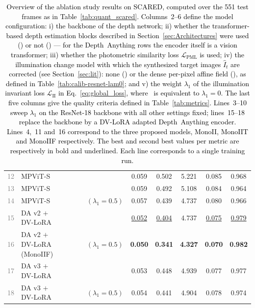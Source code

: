\documentclass[a4paper,fleqn]{cas-dc}
\newcommand{\cmark}{\ding{51}}
\newcommand{\xmark}{\ding{55}}
\begin{document}
\begin{table}[!t]
{\begin{tabular}{|r|l|c|c|c|c|c|c|c|c|c|}
        \textcolor{gray}{12} & MPViT-S & \cmark & \cmark & \cmark & \xmark & 0.059 & 0.502 & 5.221 & 0.085 & 0.968 \\
        \textcolor{gray}{13} & MPViT-S & \cmark & \cmark & \xmark & \xmark & 0.059 & 0.492 & 5.108 & 0.084 & 0.964 \\
        \textcolor{gray}{14} & MPViT-S & \cmark & \cmark & \xmark & \cmark $(\lambda_1 = 0.5)$ & 0.057 & 0.439 & 4.737 & 0.080 & 0.966 \\
        \hline
        \textcolor{gray}{15} & DA v2 $+$ DV-LoRA & \cmark & \cmark & \xmark & \xmark & \underline{0.052} & \underline{0.404} & 4.737 & \underline{0.075} & \underline{0.979} \\
        \textcolor{gray}{16} & DA v2 $+$ DV-LoRA (MonoIIF) & \cmark & \cmark & \cmark & \cmark $(\lambda_1 = 0.5)$ & \textbf{0.050} & \textbf{0.341} & \textbf{4.327} & \textbf{0.070} & \textbf{0.982}  \\
        \textcolor{gray}{17} & DA v3 $+$ DV-LoRA & \cmark & \cmark & \xmark & \xmark & 0.053 & 0.448 & 4.939 & 0.077 & 0.977  \\
        \textcolor{gray}{18} & DA v3 $+$ DV-LoRA & \cmark & \cmark & \cmark & \cmark $(\lambda_1 = 0.5)$ & 0.054 & 0.441 & 4.904 & 0.078 & 0.974 \\
        \hline
    \end{tabular}
    }
    \caption{\textcolor{black}{Overview of the ablation study results on SCARED, computed over the 551 test frames as in Table~\ref{tab:quant_scared}.
    Columns~2--6 define the model configuration: i) the backbone of the depth network; ii) whether the transformer-based depth estimation blocks described in Section~\ref{sec:Architectures} were used (\cmark) or not (\xmark) --- for the Depth~Anything rows the encoder itself is a vision transformer; iii) whether the photometric similarity loss $\mathcal{L}_\textrm{PML}$ is used; iv) the illumination change model with which the synthesized target images $\hat{I}_t$ are corrected (see Section~\ref{sec:lit}): none (\xmark) or the dense per-pixel affine field (\cmark), as defined in Table~\ref{tab:calib-resnet-lam0}; and v) the weight $\lambda_1$ of the illumination invariant loss $\mathcal{L}_\textrm{II}$ in Eq.~\eqref{eq:global_loss}, where \xmark\ is equivalent to $\lambda_1=0$.
    The last five columns give the quality criteria defined in Table~\ref{tab:metrics}.
    Lines~3--10 sweep $\lambda_1$ on the ResNet-18 backbone with all other settings fixed; lines~15--18 replace the backbone by a DV-LoRA adapted Depth~Anything encoder. Lines~4,~11 and~16 correspond to the three proposed models, MonoII, MonoIIT and MonoIIF respectively. The best and second best values per metric are respectively in bold and underlined. Each line corresponds to a single training run.}}
    \label{tab:ablation}
\end{table}
%
\end{document}
